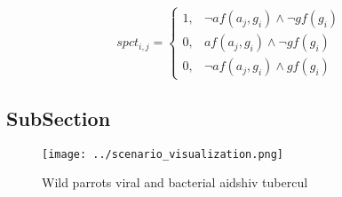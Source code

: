 \documentclass[a4paper]{article}
\begin{document}
\begin{equation}
spct_{i,j} =
\begin{cases}
1, & \text{$\neg af(a_j,g_i) \wedge \neg gf(g_i)$}\\
0, & \text{$af(a_j,g_i) \wedge \neg gf(g_i)$}\\
0, & \text{$\neg af(a_j,g_i) \wedge gf(g_i)$}
\end{cases}
\end{equation}

\subsection{SubSection}

\begin{figure}
\centering
\texttt{[image: ../scenario\_visualization.png]}
\caption{Wild parrots viral and bacterial aidshiv tubercul
}
\end{figure}
 
\end{document}
